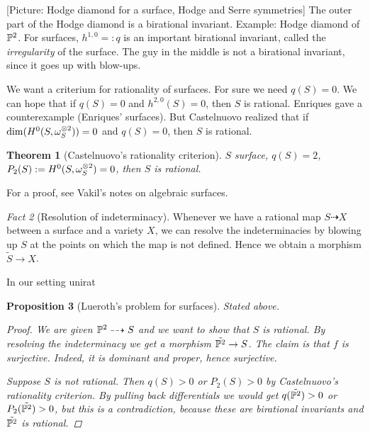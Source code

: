 \documentclass[A4paper, british, reqno]{amsart}
\theoremstyle{darkgreentheorem}
\newtheorem{thm}{Theorem}[section]
\newtheorem{prop}[thm]{Proposition}
\theoremstyle{darkbluedefinition}
\theoremstyle{darkredexample}
\theoremstyle{remark}
\newtheorem{fact}[thm]{Fact}
\newcommand{\1}{\mathbbm{1}}
\newcommand{\ot}{\otimes}
\begin{document}
[Picture: Hodge diamond for a surface, Hodge and Serre symmetries]
The outer part of the Hodge diamond is a birational invariant.
Example: Hodge diamond of $\P^{2}$.
For surfaces, $h^{1,0}=:q$ is an important birational invariant, called the \textit{irregularity} of the surface.
The guy in the middle is not a birational invariant, since it goes up with blow-ups.

We want a criterium for rationality of surfaces.
For sure we need $q(S)=0$.
We can hope that if $q(S)=0$ and $h^{2,0}(S)=0$, then $S$ is rational.
Enriques gave a counterexample (Enriques' surfaces).
But Castelnuovo realized that if $\dim(H^{0}(S,\w_{S}^{\ot 2}))=0$ and $q(S)=0$, then $S$ is rational.

\begin{thm}[Castelnuovo's rationality criterion]
    $S$ surface, $q(S)=2$, $P_{2}(S):=H^{0}(S,\w_{S}^{\ot 2})=0$, then $S$ is rational.
\end{thm}

For a proof, see Vakil's notes on algebraic surfaces.

\begin{fact}[Resolution of indeterminacy]
    Whenever we have a rational map $S\dashrightarrow X$ between a surface and a variety $X$, we can resolve the indeterminacies by blowing up $S$ at the points on which the map is not defined.
    Hence we obtain a morphism $\tilde{S}\to X$.
\end{fact}

In our setting unirat
\begin{center}
\end{center}

\begin{prop}[Lueroth's problem for surfaces]
    Stated above.
    \begin{proof}
	We are given $\P^{2}\dashrightarrow S$ and we want to show that $S$ is rational.
	By resolving the indeterminacy we get a morphism $\tilde{\P^{2}}\to S$.
	The claim is that $f$ is surjective.
	Indeed, it is dominant and proper, hence surjective.

	Suppose $S$ is not rational.
	Then $q(S)>0$ or $P_{2}(S)>0$ by Castelnuovo's rationality criterion.
	By pulling back differentials we would get $q(\tilde{\P^{2}})>0$ or $P_{2}(\tilde{\P^{2}})>0$, but this is a contradiction, because these are birational invariants and $\tilde{\P^{2}}$ is rational.
    \end{proof}
\end{prop}
\end{document}
